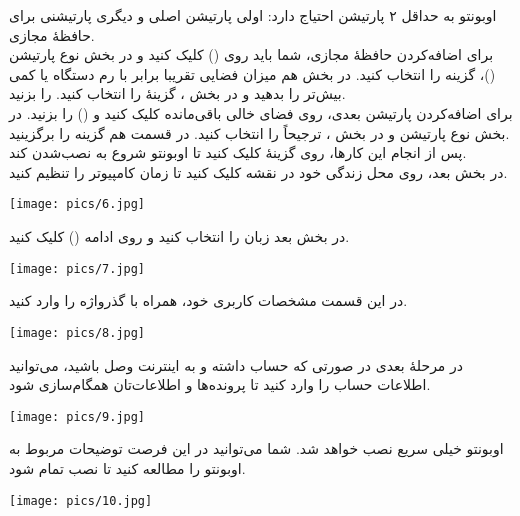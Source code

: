 اوبونتو به حداقل ۲ پارتیشن احتیاج دارد: اولی پارتیشن اصلی و دیگری پارتیشنی برای حافظهٔ مجازی.\\
برای اضافه‌کردن حافظهٔ مجازی، شما باید روی \lr{+} () کلیک کنید و در بخش نوع پارتیشن ()، گزینه  را انتخاب کنید. در بخش  هم میزان فضایی تقریبا برابر با رم دستگاه یا کمی بیش‌تر را بدهید و در بخش ، گزینهٔ  را انتخاب کنید.  را بزنید.\\
برای اضافه‌کردن پارتیشن بعدی، روی فضای خالی باقی‌مانده کلیک کنید و \lr{+} () را بزنید. در بخش نوع پارتیشن  و در بخش ، ترجیحاً  را انتخاب کنید. در قسمت  هم گزینه \lr{/} را برگزینید.\\
پس از انجام این کارها، روی گزینهٔ  کلیک کنید تا اوبونتو شروع به نصب‌شدن کند.\\
در بخش بعد، روی محل زندگی خود در نقشه کلیک کنید تا زمان کامپیوتر را تنظیم کنید.\\
\begin{center}
\texttt{[image: pics/6.jpg]}\\
\end{center}
در بخش بعد زبان  را انتخاب کنید و روی ادامه () کلیک کنید.\\
\begin{center}
\texttt{[image: pics/7.jpg]}\\
\end{center}
در این قسمت مشخصات کاربری خود، همراه با گذرواژه را وارد کنید.
\begin{center}
\texttt{[image: pics/8.jpg]}
\end{center}
در مرحلهٔ بعدی در صورتی که حساب  داشته و به اینترنت وصل باشید، می‌توانید اطلاعات حساب را وارد کنید تا پرونده‌ها و اطلاعات‌تان همگام‌سازی شود.
\begin{center}
\texttt{[image: pics/9.jpg]}
\end{center}
اوبونتو خیلی سریع نصب خواهد شد. شما می‌توانید در این فرصت توضیحات مربوط به اوبونتو را مطالعه کنید تا نصب تمام شود.
\begin{center}
\texttt{[image: pics/10.jpg]}
\end{center}
